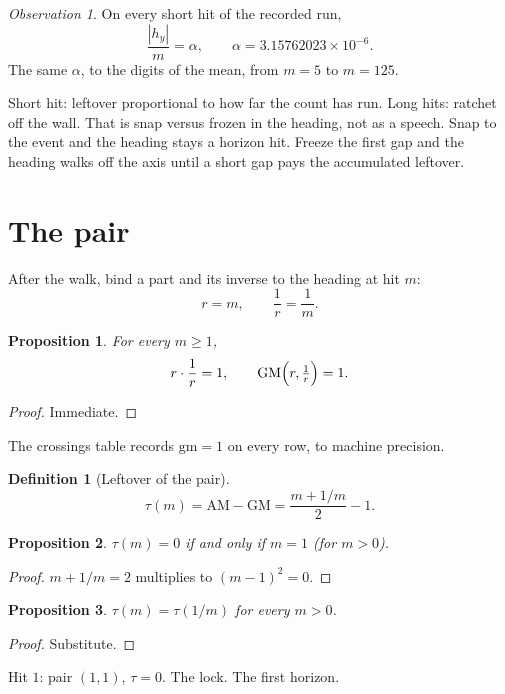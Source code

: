 \documentclass[10pt,a4paper]{article}
\theoremstyle{plain}
\newtheorem{proposition}{Proposition}
\theoremstyle{definition}
\newtheorem{definition}{Definition}
\theoremstyle{remark}
\newtheorem{observation}{Observation}
\begin{document}
\begin{observation}
On every short hit of the recorded run,
\[
\frac{|h_y|}{m}=\alpha,\qquad
\alpha=3.15762023\times 10^{-6}.
\]
The same \(\alpha\), to the digits of the mean, from \(m=5\) to \(m=125\).
\end{observation}

Short hit: leftover proportional to how far the count has run.
Long hits: ratchet off the wall.
That is snap versus frozen in the heading, not as a speech.
Snap to the event and the heading stays a horizon hit.
Freeze the first gap and the heading walks off the axis until a short gap pays the accumulated leftover.

\section{The pair}

After the walk, bind a part and its inverse to the heading at hit \(m\):
\[
r=m,\qquad \frac1r=\frac1m.
\]

\begin{proposition}
For every \(m\ge 1\),
\[
r\cdot\frac1r=1,\qquad
\mathrm{GM}\Bigl(r,\tfrac1r\Bigr)=1.
\]
\end{proposition}

\begin{proof}
Immediate.
\end{proof}

The crossings table records \(\mathrm{gm}=1\) on every row, to machine precision.

\begin{definition}[Leftover of the pair]
\[
\tau(m)=\mathrm{AM}-\mathrm{GM}
=\frac{m+1/m}{2}-1.
\]
\end{definition}

\begin{proposition}
\(\tau(m)=0\) if and only if \(m=1\) (for \(m>0\)).
\end{proposition}

\begin{proof}
\(m+1/m=2\) multiplies to \((m-1)^2=0\).
\end{proof}

\begin{proposition}
\(\tau(m)=\tau(1/m)\) for every \(m>0\).
\end{proposition}

\begin{proof}
Substitute.
\end{proof}

Hit \(1\): pair \((1,1)\), \(\tau=0\).
The lock.
The first horizon.
\end{document}
